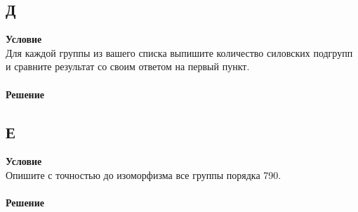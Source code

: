 		\subsection*{Д}
		\textbf{Условие}\\
		Для каждой группы из вашего списка выпишите количество силовских подгрупп и сравните результат со своим ответом на первый пункт.\\
		\\
		\textbf{Решение}\\
		
		
		\subsection*{Е}
		\textbf{Условие}\\
		Опишите с точностью до изоморфизма все группы порядка 790.\\
		\\
		\textbf{Решение}\\
		
		